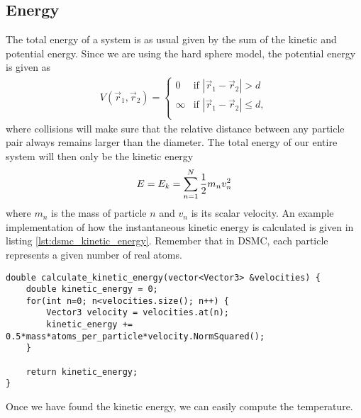 \subsection{Energy}
The total energy of a system is as usual given by the sum of the kinetic and potential energy. Since we are using the hard sphere model, the potential energy is given as
\begin{align}
	V(\vec r_1, \vec r_2) = \left\{
	\begin{array}{lr}
	0 & \text{if } |\vec r_1  - \vec r_2| > d\\
	\infty & \text{if } |\vec r_1  - \vec r_2| \leq d,\\
	\end{array}
	\right .
\end{align}
where collisions will make sure that the relative distance between any particle pair always remains larger than the diameter. The total energy of our entire system will then only be the kinetic energy
\begin{align}
	E = E_k = \sum_{n=1}^N {1\over 2}m_nv_n^2
\end{align}
where $m_n$ is the mass of particle $n$ and $v_n$ is its scalar velocity. An example implementation of how the instantaneous kinetic energy is calculated is given in listing \ref{lst:dsmc_kinetic_energy}. Remember that in DSMC, each particle represents a given number of real atoms.

\begin{lstlisting}[caption=Calculation of kinetic energy., label=lst:dsmc_kinetic_energy]
double calculate_kinetic_energy(vector<Vector3> &velocities) {
	double kinetic_energy = 0;
	for(int n=0; n<velocities.size(); n++) {
		Vector3 velocity = velocities.at(n);
		kinetic_energy += 0.5*mass*atoms_per_particle*velocity.NormSquared();
	}

	return kinetic_energy;
}
\end{lstlisting}
Once we have found the kinetic energy, we can easily compute the temperature.
